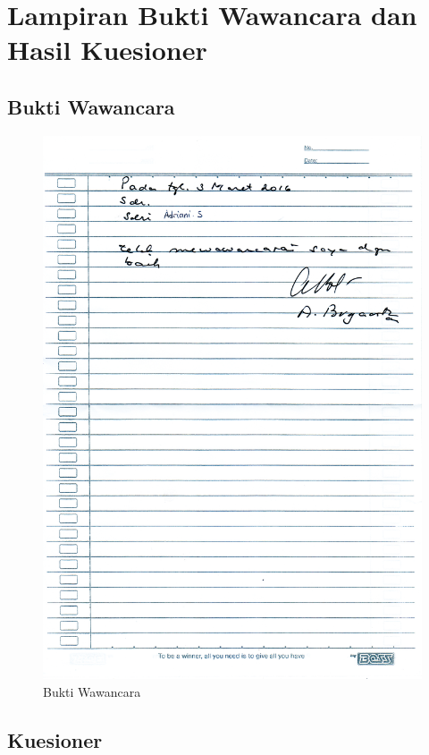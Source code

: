 \chapter{Lampiran Bukti Wawancara dan Hasil Kuesioner}
\label{app:A}

\section{Bukti Wawancara}
\label{sec:buktiwawancara}

	\begin{figure}[htbp]
		\centering
			\includegraphics[scale=0.6]{Gambar/sc0006.JPG}
			\caption{Bukti Wawancara}
		\label{fig:bukti}
	\end{figure}

\section{Kuesioner}

